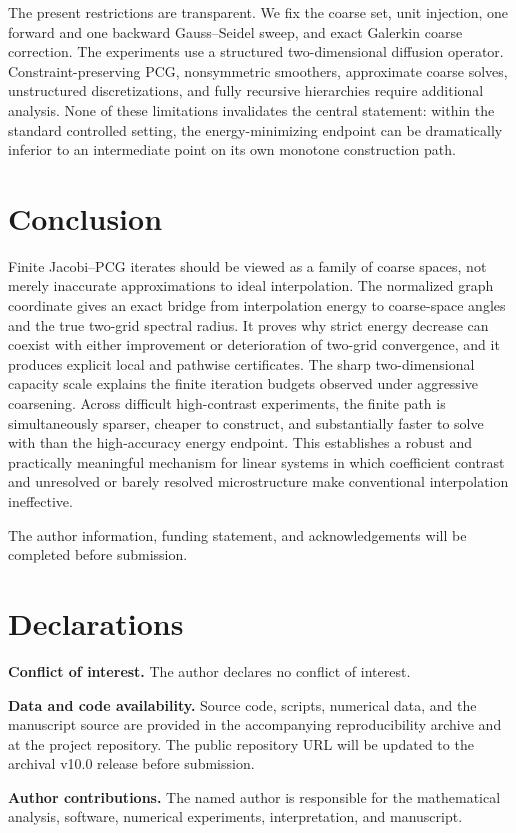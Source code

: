 \documentclass[smallextended]{svjour3}
\begin{document}
The present restrictions are transparent. We fix the coarse set, unit injection, one forward and one backward Gauss--Seidel sweep, and exact Galerkin coarse correction. The experiments use a structured two-dimensional diffusion operator. Constraint-preserving PCG, nonsymmetric smoothers, approximate coarse solves, unstructured discretizations, and fully recursive hierarchies require additional analysis. None of these limitations invalidates the central statement: within the standard controlled setting, the energy-minimizing endpoint can be dramatically inferior to an intermediate point on its own monotone construction path.

\section{Conclusion}\label{sec:conclusion}
Finite Jacobi--PCG iterates should be viewed as a family of coarse spaces, not merely inaccurate approximations to ideal interpolation. The normalized graph coordinate gives an exact bridge from interpolation energy to coarse-space angles and the true two-grid spectral radius. It proves why strict energy decrease can coexist with either improvement or deterioration of two-grid convergence, and it produces explicit local and pathwise certificates. The sharp two-dimensional capacity scale explains the finite iteration budgets observed under aggressive coarsening. Across difficult high-contrast experiments, the finite path is simultaneously sparser, cheaper to construct, and substantially faster to solve with than the high-accuracy energy endpoint. This establishes a robust and practically meaningful mechanism for linear systems in which coefficient contrast and unresolved or barely resolved microstructure make conventional interpolation ineffective.

\begin{acknowledgements}
The author information, funding statement, and acknowledgements will be completed before submission.
\end{acknowledgements}

\section*{Declarations}
\textbf{Conflict of interest.} The author declares no conflict of interest.\par
\textbf{Data and code availability.} Source code, scripts, numerical data, and the manuscript source are provided in the accompanying reproducibility archive and at the project repository. The public repository URL will be updated to the archival v10.0 release before submission.\par
\textbf{Author contributions.} The named author is responsible for the mathematical analysis, software, numerical experiments, interpretation, and manuscript.
\end{document}
